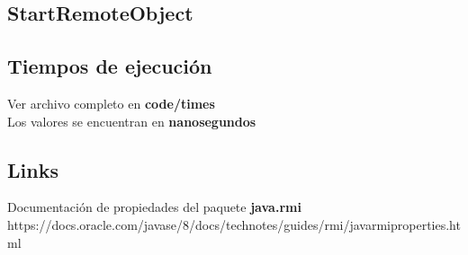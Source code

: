 \documentclass[12pt,journal,compsoc]{IEEEtran}
\begin{document}
\subsection{StartRemoteObject}
\label{section:StartRemoteObject}


\subsection{Tiempos de ejecución}
Ver archivo completo en \textbf{code/times}\\
Los valores se encuentran en \textbf{nanosegundos}
\label{section:times}


\subsection{Links}
\label{section:links}
Documentación de propiedades del paquete \textbf{java.rmi}\\
https://docs.oracle.com/javase/8/docs/technotes/guides/rmi/javarmiproperties.html

\ifCLASSOPTIONcaptionsoff
  \newpage
\fi
\end{document}
